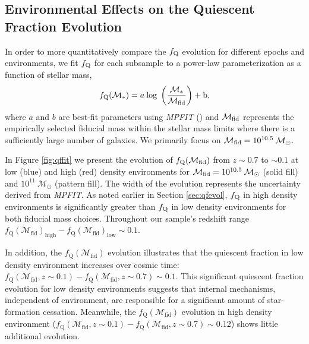 \documentclass{emulateapj}
\begin{document}
\subsection{Environmental Effects on the Quiescent Fraction Evolution} \label{sec:env_qf_evol}
In order to more quantitatively compare the $f_{\rm{Q}}$ evolution for different epochs and environments, we fit $f_{\rm{Q}}$ for each subsample to a power-law parameterization as a function of stellar mass, 
\begin{equation} \label{eq:qffit}
f_{\rm{Q}}(\mathcal{M}_{*}) = a \: \rm{log} \; \left(\frac{ \mathcal{M}_{*}}{\mathcal{M}_{\rm{fid}}} \right)+b,
\end{equation}
where $a$ and $b$ are best-fit parameters using {\em MPFIT} (\citealt{Markwardt:2009aa}) and $\mathcal{M}_{\rm{fid}}$ represents the empirically selected fiducial mass within the stellar mass limits where there is a sufficiently large number of galaxies. We primarily focus on $\mathcal{M}_{\rm{fid}} = 10^{10.5} \: \mathcal{M}_{\odot}$. 

In Figure \ref{fig:qffit} we present the evolution of
$f_{\rm{Q}}(\mathcal{M}_{\rm{fid}})$ from $z \sim 0.7$ to $\sim 0.1$
at low (blue) and high (red) density environments for
$\mathcal{M}_{\rm{fid}} = 10^{10.5} \: \mathcal{M}_{\odot}$ (solid
fill) and $10^{11} \: \mathcal{M}_{\odot}$ (pattern fill). The width
of the evolution represents the uncertainty derived from {\em
  MPFIT}. As noted earlier in Section \ref{sec:qfevol}, $f_{\rm{Q}}$
in high density environments is significantly greater than
$f_{\rm{Q}}$ in low density environments for both fiducial mass
choices. Throughout our sample's redshift range
$f_{\mathrm{Q}}(\mathcal{M}_{\mathrm{fid}})_{\mathrm{high}} -
f_{\mathrm{Q}}(\mathcal{M}_{\mathrm{fid}})_{\mathrm{low}} \sim 0.1$.

In addition, the $f_{\mathrm{Q}}(\mathcal{M}_{\mathrm{fid}})$
evolution illustrates that the quiescent fraction in low density
environment increases over cosmic time:
$f_{\mathrm{Q}}(\mathcal{M}_{\mathrm{fid}}, z \sim 0.1) -
f_{\mathrm{Q}}(\mathcal{M}_{\mathrm{fid}}, z \sim 0.7) \sim 0.1$. This
significant quiescent fraction evolution for low density environments
suggests that internal mechanisms, independent of environment, are
responsible for a significant amount of star-formation cessation. Meanwhile, the $f_{\mathrm{Q}}(\mathcal{M}_{\mathrm{fid}})$ evolution in high density environment ($f_{\mathrm{Q}}(\mathcal{M}_{\mathrm{fid}}, z \sim 0.1) - f_{\mathrm{Q}}(\mathcal{M}_{\mathrm{fid}}, z \sim 0.7) \sim 0.12$) shows little additional evolution.
\end{document}
